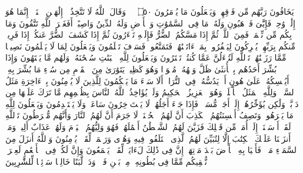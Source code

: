 \startbuffer[\q:16:50]
یَخَافُونَ رَبَّهُم مِّن فَوۡقِهِمۡ وَیَفۡعَلُونَ مَا یُؤۡمَرُونَ ۝٥٠ ۩%
\stopbuffer%
\startbuffer[\q:16:51]
۞ وَقَالَ ٱللَّهُ لَا تَتَّخِذُوۤا۟ إِلَٰهَیۡنِ ٱثۡنَیۡنِۖ إِنَّمَا هُوَ إِلَٰهࣱ وَٰحِدࣱ فَإِیَّٰیَ فَٱرۡهَبُونِ%
\stopbuffer%
\startbuffer[\q:16:52]
وَلَهُۥ مَا فِی ٱلسَّمَٰوَٰتِ وَٱلۡأَرۡضِ وَلَهُ ٱلدِّینُ وَاصِبًاۚ أَفَغَیۡرَ ٱللَّهِ تَتَّقُونَ%
\stopbuffer%
\startbuffer[\q:16:53]
وَمَا بِكُم مِّن نِّعۡمَةࣲ فَمِنَ ٱللَّهِۖ ثُمَّ إِذَا مَسَّكُمُ ٱلضُّرُّ فَإِلَیۡهِ تَجۡءَرُونَ%
\stopbuffer%
\startbuffer[\q:16:54]
ثُمَّ إِذَا كَشَفَ ٱلضُّرَّ عَنكُمۡ إِذَا فَرِیقࣱ مِّنكُم بِرَبِّهِمۡ یُشۡرِكُونَ%
\stopbuffer%
\startbuffer[\q:16:55]
لِیَكۡفُرُوا۟ بِمَاۤ ءَاتَیۡنَٰهُمۡۚ فَتَمَتَّعُوا۟ فَسَوۡفَ تَعۡلَمُونَ%
\stopbuffer%
\startbuffer[\q:16:56]
وَیَجۡعَلُونَ لِمَا لَا یَعۡلَمُونَ نَصِیبࣰا مِّمَّا رَزَقۡنَٰهُمۡۗ تَٱللَّهِ لَتُسۡءَلُنَّ عَمَّا كُنتُمۡ تَفۡتَرُونَ%
\stopbuffer%
\startbuffer[\q:16:57]
وَیَجۡعَلُونَ لِلَّهِ ٱلۡبَنَٰتِ سُبۡحَٰنَهُۥ وَلَهُم مَّا یَشۡتَهُونَ%
\stopbuffer%
\startbuffer[\q:16:58]
وَإِذَا بُشِّرَ أَحَدُهُم بِٱلۡأُنثَىٰ ظَلَّ وَجۡهُهُۥ مُسۡوَدࣰّا وَهُوَ كَظِیمࣱ%
\stopbuffer%
\startbuffer[\q:16:59]
یَتَوَٰرَىٰ مِنَ ٱلۡقَوۡمِ مِن سُوۤءِ مَا بُشِّرَ بِهِۦۤۚ أَیُمۡسِكُهُۥ عَلَىٰ هُونٍ أَمۡ یَدُسُّهُۥ فِی ٱلتُّرَابِۗ أَلَا سَاۤءَ مَا یَحۡكُمُونَ%
\stopbuffer%
\startbuffer[\q:16:60]
لِلَّذِینَ لَا یُؤۡمِنُونَ بِٱلۡءَاخِرَةِ مَثَلُ ٱلسَّوۡءِۖ وَلِلَّهِ ٱلۡمَثَلُ ٱلۡأَعۡلَىٰۚ وَهُوَ ٱلۡعَزِیزُ ٱلۡحَكِیمُ%
\stopbuffer%
\startbuffer[\q:16:61]
وَلَوۡ یُؤَاخِذُ ٱللَّهُ ٱلنَّاسَ بِظُلۡمِهِم مَّا تَرَكَ عَلَیۡهَا مِن دَاۤبَّةࣲ وَلَٰكِن یُؤَخِّرُهُمۡ إِلَىٰۤ أَجَلࣲ مُّسَمࣰّىۖ فَإِذَا جَاۤءَ أَجَلُهُمۡ لَا یَسۡتَءۡخِرُونَ سَاعَةࣰ وَلَا یَسۡتَقۡدِمُونَ%
\stopbuffer%
\startbuffer[\q:16:62]
وَیَجۡعَلُونَ لِلَّهِ مَا یَكۡرَهُونَۚ وَتَصِفُ أَلۡسِنَتُهُمُ ٱلۡكَذِبَ أَنَّ لَهُمُ ٱلۡحُسۡنَىٰۚ لَا جَرَمَ أَنَّ لَهُمُ ٱلنَّارَ وَأَنَّهُم مُّفۡرَطُونَ%
\stopbuffer%
\startbuffer[\q:16:63]
تَٱللَّهِ لَقَدۡ أَرۡسَلۡنَاۤ إِلَىٰۤ أُمَمࣲ مِّن قَبۡلِكَ فَزَیَّنَ لَهُمُ ٱلشَّیۡطَٰنُ أَعۡمَٰلَهُمۡ فَهُوَ وَلِیُّهُمُ ٱلۡیَوۡمَ وَلَهُمۡ عَذَابٌ أَلِیمࣱ%
\stopbuffer%
\startbuffer[\q:16:64]
وَمَاۤ أَنزَلۡنَا عَلَیۡكَ ٱلۡكِتَٰبَ إِلَّا لِتُبَیِّنَ لَهُمُ ٱلَّذِی ٱخۡتَلَفُوا۟ فِیهِ وَهُدࣰى وَرَحۡمَةࣰ لِّقَوۡمࣲ یُؤۡمِنُونَ%
\stopbuffer%
\startbuffer[\q:16:65]
وَٱللَّهُ أَنزَلَ مِنَ ٱلسَّمَاۤءِ مَاۤءࣰ فَأَحۡیَا بِهِ ٱلۡأَرۡضَ بَعۡدَ مَوۡتِهَاۤۚ إِنَّ فِی ذَٰلِكَ لَءَایَةࣰ لِّقَوۡمࣲ یَسۡمَعُونَ%
\stopbuffer%
\startbuffer[\q:16:66]
وَإِنَّ لَكُمۡ فِی ٱلۡأَنۡعَٰمِ لَعِبۡرَةࣰۖ نُّسۡقِیكُم مِّمَّا فِی بُطُونِهِۦ مِنۢ بَیۡنِ فَرۡثࣲ وَدَمࣲ لَّبَنًا خَالِصࣰا سَاۤئِغࣰا لِّلشَّٰرِبِینَ%
